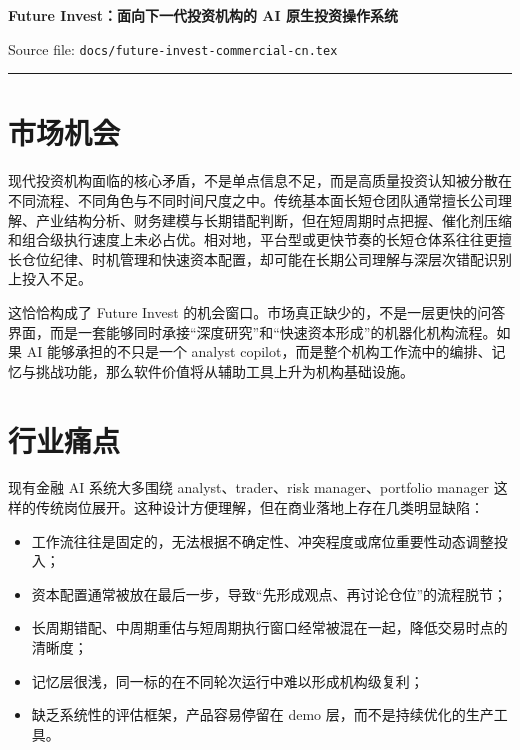 \documentclass[11pt]{article}
\begin{document}
\begin{center}
{\LARGE\bfseries Future Invest：面向下一代投资机构的 AI 原生投资操作系统\par}
\vspace{0.75em}
{\small \textcolor{fiSlate}{Source file: \texttt{docs/future-invest-commercial-cn.tex}}}
\end{center}

\vspace{0.8em}
\hrule
\vspace{1em}

\begin{abstract}
Future Invest 的目标，不是把投研流程再做成一个更聪明的助手，而是重做投资机构本身的决策机器。今天的大多数团队并不缺信息，也不缺观点，真正稀缺的是把研究、反证、时点判断、仓位配置和复盘学习连成一体的能力。Future Invest 用一套可编排、可约束、可积累的 AI 工作流，把“写出观点”推进到“形成资本决策”，让机构第一次能够把自己的判断方法沉淀成系统，而不是停留在人和会议里。它真正的商业价值，不只是提效，而是帮助对冲基金、家族办公室和机构投研团队建立更强的决策质量、更快的执行节奏，以及可以持续复利的机构能力。
\end{abstract}

\section{市场机会}

现代投资机构面临的核心矛盾，不是单点信息不足，而是高质量投资认知被分散在不同流程、不同角色与不同时间尺度之中。传统基本面长短仓团队通常擅长公司理解、产业结构分析、财务建模与长期错配判断，但在短周期时点把握、催化剂压缩和组合级执行速度上未必占优。相对地，平台型或更快节奏的长短仓体系往往更擅长仓位纪律、时机管理和快速资本配置，却可能在长期公司理解与深层次错配识别上投入不足。

这恰恰构成了 Future Invest 的机会窗口。市场真正缺少的，不是一层更快的问答界面，而是一套能够同时承接“深度研究”和“快速资本形成”的机器化机构流程。如果 AI 能够承担的不只是一个 analyst copilot，而是整个机构工作流中的编排、记忆与挑战功能，那么软件价值将从辅助工具上升为机构基础设施。

\section{行业痛点}

现有金融 AI 系统大多围绕 analyst、trader、risk manager、portfolio manager 这样的传统岗位展开。这种设计方便理解，但在商业落地上存在几类明显缺陷：

\begin{itemize}
\item 工作流往往是固定的，无法根据不确定性、冲突程度或席位重要性动态调整投入；
\item 资本配置通常被放在最后一步，导致“先形成观点、再讨论仓位”的流程脱节；
\item 长周期错配、中周期重估与短周期执行窗口经常被混在一起，降低交易时点的清晰度；
\item 记忆层很浅，同一标的在不同轮次运行中难以形成机构级复利；
\item 缺乏系统性的评估框架，产品容易停留在 demo 层，而不是持续优化的生产工具。
\end{itemize}
\end{document}
